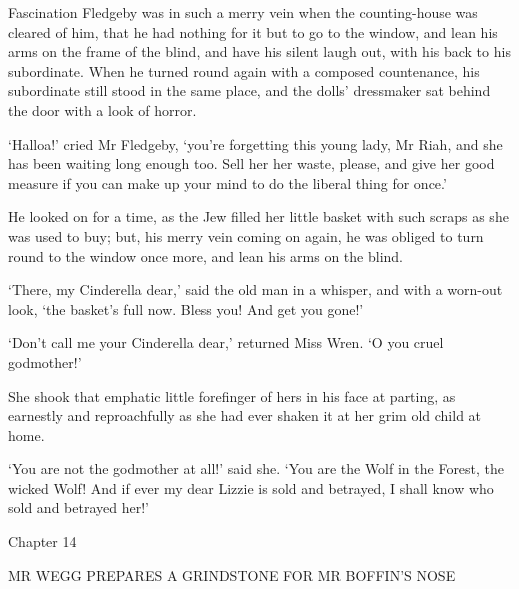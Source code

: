 Fascination Fledgeby was in such a merry vein when the counting-house
was cleared of him, that he had nothing for it but to go to the window,
and lean his arms on the frame of the blind, and have his silent laugh
out, with his back to his subordinate. When he turned round again with a
composed countenance, his subordinate still stood in the same place, and
the dolls’ dressmaker sat behind the door with a look of horror.

‘Halloa!’ cried Mr Fledgeby, ‘you’re forgetting this young lady, Mr
Riah, and she has been waiting long enough too. Sell her her waste,
please, and give her good measure if you can make up your mind to do the
liberal thing for once.’

He looked on for a time, as the Jew filled her little basket with such
scraps as she was used to buy; but, his merry vein coming on again, he
was obliged to turn round to the window once more, and lean his arms on
the blind.

‘There, my Cinderella dear,’ said the old man in a whisper, and with a
worn-out look, ‘the basket’s full now. Bless you! And get you gone!’

‘Don’t call me your Cinderella dear,’ returned Miss Wren. ‘O you cruel
godmother!’

She shook that emphatic little forefinger of hers in his face at
parting, as earnestly and reproachfully as she had ever shaken it at her
grim old child at home.

‘You are not the godmother at all!’ said she. ‘You are the Wolf in
the Forest, the wicked Wolf! And if ever my dear Lizzie is sold and
betrayed, I shall know who sold and betrayed her!’



Chapter 14

MR WEGG PREPARES A GRINDSTONE FOR MR BOFFIN’S NOSE



